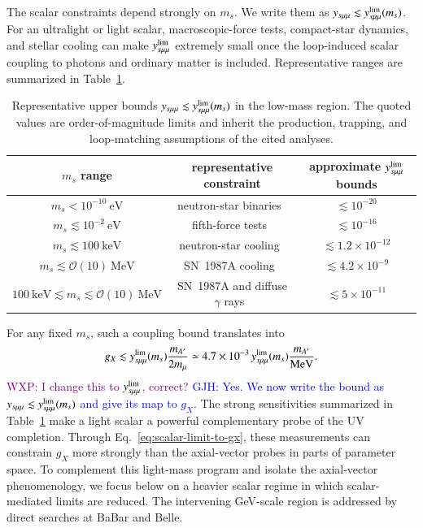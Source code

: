 \documentclass[onecolumn, aps, nofootinbib, prd, preprint, floats, floatfix, amsmath, amssymb, superscriptaddress, preprintnumbers]{revtex4-2}
\newcommand{\GJH}[1]{\textcolor{blue}{GJH: #1}}
\newcommand{\WXP}[1]{\textcolor{purple}{WXP: #1}}
\begin{document}
The scalar constraints depend strongly on $m_s$. We write them as $y_{s\mu\mu}\lesssim y_{s\mu\mu}^{\rm lim}(m_s)$. For an ultralight or light scalar, macroscopic-force tests, compact-star dynamics, and stellar cooling can make $y_{s\mu\mu}^{\rm lim}$ extremely small once the loop-induced scalar coupling to photons and ordinary matter is included. Representative ranges are summarized in Table~\ref{tab:scalar_constraints}.
\begin{table}[htbp]
\centering
\begin{tabular}{ccc}
\hline
$m_s$ range & representative constraint & approximate $y_{s\mu\mu}^{\rm lim}$ bounds \\
\hline
$m_s<10^{-10}~\mathrm{eV}$ & neutron-star binaries~\cite{Dror:2019uea,Liu:2025zuz} & $\lesssim10^{-20}$ \\
$m_s\lesssim10^{-2}~\mathrm{eV}$ & fifth-force tests~\cite{Hoskins:1985tn,Kapner:2006si,Blakemore:2021zna} & $\lesssim10^{-16}$ \\
$m_s\lesssim100~\mathrm{keV}$ & neutron-star cooling~\cite{Fiorillo:2026wso} & $\lesssim1.2\times10^{-12}$ \\
$m_s\lesssim\mathcal O(10)~\mathrm{MeV}$ & SN~1987A cooling~\cite{Caputo:2021rux,Balazs:2022tjl} & $\lesssim4.2\times10^{-9}$ \\
$100~\mathrm{keV}\lesssim m_s\lesssim\mathcal O(10)~\mathrm{MeV}$ & SN~1987A and diffuse $\gamma$ rays~\cite{Caputo:2021rux,Balazs:2022tjl} & $\lesssim5\times10^{-11}$ \\
\hline
\end{tabular}
\caption{Representative upper bounds $y_{s\mu\mu}\lesssim y_{s\mu\mu}^{\rm lim}(m_s)$ in the low-mass region. The quoted values are order-of-magnitude limits and inherit the production, trapping, and loop-matching assumptions of the cited analyses.}
\label{tab:scalar_constraints}
\end{table}

For any fixed $m_s$, such a coupling bound translates into
\begin{equation}
g_X\lesssim y_{s\mu\mu}^{\rm lim}(m_s)\frac{m_{A'}}{2m_\mu}
\simeq4.7\times10^{-3}\,y_{s\mu\mu}^{\rm lim}(m_s)
\frac{m_{A'}}{\mathrm{MeV}}.
\label{eq:scalar-limit-to-gx}
\end{equation}
\WXP{I change this to $y_{s\mu\mu}^{\rm lim}$, correct?}
\GJH{Yes. We now write the bound as $y_{s\mu\mu}\lesssim y_{s\mu\mu}^{\rm lim}(m_s)$ and give its map to $g_X$.}
The strong sensitivities summarized in Table~\ref{tab:scalar_constraints} make a light scalar a powerful complementary probe of the UV completion. Through Eq.~\eqref{eq:scalar-limit-to-gx}, these measurements can constrain $g_X$ more strongly than the axial-vector probes in parts of parameter space. To complement this light-mass program and isolate the axial-vector phenomenology, we focus below on a heavier scalar regime in which scalar-mediated limits are reduced. The intervening GeV-scale region is addressed by direct searches at BaBar and Belle.
\end{document}
